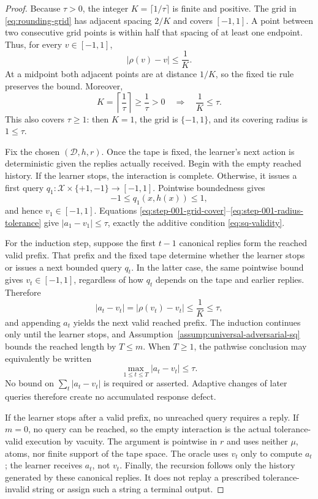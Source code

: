 \begin{proof}
Because \(\tau>0\), the integer \(K=\lceil1/\tau\rceil\) is finite and
positive.  The grid in \eqref{eq:rounding-grid} has adjacent spacing \(2/K\)
and covers \([-1,1]\).  A point between two consecutive grid points is
within half that spacing of at least one endpoint.  Thus, for every
\(v\in[-1,1]\),
\begin{equation}
|\rho(v)-v|\le\frac{1}{K}.
\label{eq:step-001-grid-cover}
\end{equation}
At a midpoint both adjacent points are at distance \(1/K\), so the fixed tie
rule preserves the bound.  Moreover,
\begin{equation}
K=\left\lceil\frac{1}{\tau}\right\rceil
\ge\frac{1}{\tau}>0
\quad\Longrightarrow\quad
\frac{1}{K}\le\tau.
\label{eq:step-001-radius-tolerance}
\end{equation}
This also covers \(\tau\ge1\): then \(K=1\), the grid is
\(\{-1,1\}\), and its covering radius is \(1\le\tau\).

Fix the chosen \((\mathcal D,h,r)\).  Once the tape is fixed, the learner's
next action is deterministic given the replies actually received.  Begin
with the empty reached history.  If the learner stops, the interaction is
complete.  Otherwise, it issues a first query
\(q_1:\mathcal X\times\{+1,-1\}\to[-1,1]\).  Pointwise boundedness gives
\[
-1\le q_1(x,h(x))\le1,
\]
and hence \(v_1\in[-1,1]\).  Equations
\eqref{eq:step-001-grid-cover}--\eqref{eq:step-001-radius-tolerance} give
\( |a_1-v_1|\le\tau\), exactly the additive condition
\eqref{eq:sq-validity}.

For the induction step, suppose the first \(t-1\) canonical replies form the
reached valid prefix.  That prefix and the fixed tape determine whether the
learner stops or issues a next bounded query \(q_t\).  In the latter case,
the same pointwise bound gives \(v_t\in[-1,1]\), regardless of how \(q_t\)
depends on the tape and earlier replies.  Therefore
\begin{equation}
|a_t-v_t|=|\rho(v_t)-v_t|
\le\frac{1}{K}\le\tau,
\label{eq:step-001-reached-validity}
\end{equation}
and appending \(a_t\) yields the next valid reached prefix.  The induction
continues only until the learner stops, and
Assumption~\ref{assump:universal-adversarial-sq} bounds the reached length by
\(T\le m\).  When \(T\ge1\), the pathwise conclusion may equivalently be
written
\[
\max_{1\le t\le T}|a_t-v_t|\le\tau.
\]
No bound on \(\sum_t|a_t-v_t|\) is required or asserted.  Adaptive changes
of later queries therefore create no accumulated response defect.

If the learner stops after a valid prefix, no unreached query requires a
reply.  If \(m=0\), no query can be reached, so the empty interaction is the
actual tolerance-valid execution by vacuity.  The argument is pointwise in
\(r\) and uses neither \(\mu\), atoms, nor finite support of the tape space.
The oracle uses \(v_t\) only to compute \(a_t\); the learner receives
\(a_t\), not \(v_t\).  Finally, the recursion follows only the history
generated by these canonical replies.  It does not replay a prescribed
tolerance-invalid string or assign such a string a terminal output.
\end{proof}

